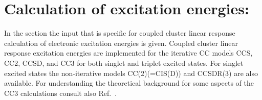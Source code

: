 
\section{Calculation of excitation energies: }\label{sec:ccexci}

In the  section the input that is
specific for coupled cluster linear response calculation of
electronic excitation energies is given. 
Coupled cluster linear response excitation energies 
are implemented for the iterative CC models CCS, CC2, CCSD, and CC3 for 
both singlet and triplet excited states.
For singlet excited states the non-iterative models CC(2)(=CIS(D)) and CCSDR(3)
are also available.
For understanding the theoretical background for some
aspects of the CC3 calculations consult also Ref.\ \cite{Christiansen:JCP105,Hald:JCP113,Christiansen:JCP103,Hald:JCP115}.

\begin{center}
\end{center}



